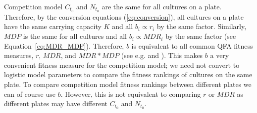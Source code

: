 Competition model \(C_{t_{0}}\) and \(N_{t_{0}}\) are the same for all
cultures on a plate. Therefore, by the conversion equations
(\ref{eq:conversion}), all cultures on a plate have the same carrying
capacity \(K\) and all \(b_{i} \propto r_{i}\) by the same
factor. Similarly, \(MDP\) is the same for all cultures and all
\(b_{i} \propto MDR_{i}\) by the same factor (see
Equation~\ref{eq:MDR_MDP}). Therefore, \(b\) is equivalent to all
common QFA fitness measures, \(r\), \(MDR\), and \(MDR*MDP\) (see
e.g. \citet{Addinall2011} and \citet{qfa2016}). This makes \(b\) a
very convenient fitness measure for the competition model; we need not
convert to logistic model parameters to compare the fitness rankings
of cultures on the same plate. To compare competition model fitness
rankings between different plates we can of course use \(b\). However,
this is not equivalent to comparing \(r\) or \(MDR\) as different
plates may have different \(C_{t_{0}}\) and \(N_{t_{0}}\).

